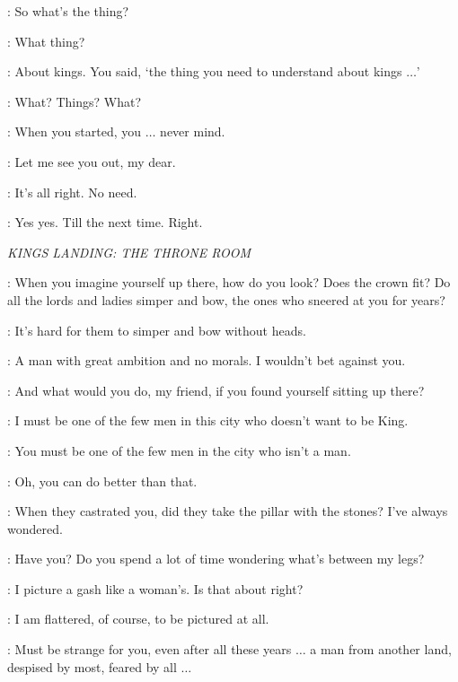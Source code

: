 \ROS: So what's the thing? 

\PYCELLE: What thing? 

\ROS: About kings. You said, `the thing you need to understand about kings $\ldots$' 

\PYCELLE: What? Things? What? 

\ROS: When you started, you $\ldots$ never mind. 

\PYCELLE: Let me see you out, my dear. 

\ROS: It's all right. No need. 


\PYCELLE: Yes yes. Till the next time. Right. 



\scene

\textit{KINGS LANDING: THE THRONE ROOM}


\VARYS: When you imagine yourself up there, how do you look? Does the crown fit? Do all the lords and ladies simper and bow, the ones who sneered at you for years? 

\LITTLEFINGER: It's hard for them to simper and bow without heads. 

\VARYS: A man with great ambition and no morals. I wouldn't bet against you. 

\LITTLEFINGER: And what would you do, my friend, if you found yourself sitting up there? 

\VARYS: I must be one of the few men in this city who doesn't want to be King. 

\LITTLEFINGER: You must be one of the few men in the city who isn't a man. 

\VARYS: Oh, you can do better than that. 

\LITTLEFINGER: When they castrated you, did they take the pillar with the stones? I've always wondered. 

\VARYS: Have you? Do you spend a lot of time wondering what's between my legs? 

\LITTLEFINGER: I picture a gash like a woman's. Is that about right? 

\VARYS: I am flattered, of course, to be pictured at all. 

\LITTLEFINGER: Must be strange for you, even after all these years $\ldots$ a man from another land, despised by most, feared by all $\ldots$  

